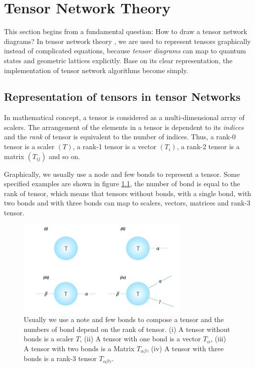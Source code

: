 \chapter{Tensor Network Theory}
This section begins from a fundamental question: How to draw a tensor network diagrams? In tensor network theory \cite{jordan_studies_2011} \cite{orus_practical_2014} \cite{bauer_tensor_2011}, we are used to represent tensors graphically instead of complicated equations, because \textit{tensor diagrams} can map to quantum states and geometric lattices explicitly. Base on its clear representation, the implementation of  tensor network algorithms become simply. \section{Representation of tensors in tensor Networks}
\label{notations}
In mathematical concept, a tensor is considered as a multi-dimensional array of scalers. The arrangement of the elements in a tensor is dependent to its \textit{indices} and the \textit{rank} of tensor is equivalent to the number of indices. Thus, a rank-0 tensor is a scaler $(T)$, a rank-1 tensor is a vector $(T_{i})$, a rank-2 tensor is a matrix $(T_{ij})$ and so on. 

Graphically, we usually use a node and few bonds to represent a tensor. Some specified examples are shown in figure \ref{fig211}, the number of bond is equal to the rank of tensor, which means that tensors without bonds, with a single bond, with two bonds and with three bonds can map to scalers, vectors, matrices and rank-3 tensor.

\begin{figure}[ht]
	\centering
	\includegraphics[width=0.75\textwidth]{figures/fig211.png}
	\caption[The reprecentation of commen tensors.]{Usually we use a note and few bonds to compose a tensor and the numbers of bond depend on the rank of tensor. (i) A tensor without bonds is a scaler $T$, (ii) A tensor with one bond is a vector $T_{\alpha}$, (iii) A tensor with two bonds is a Matrix $T_{\alpha \beta}$, (iv) A tensor with three bonds is a rank-3 tensor $T_{\alpha \beta \gamma}$.}
	\label{fig211}
\end{figure}

